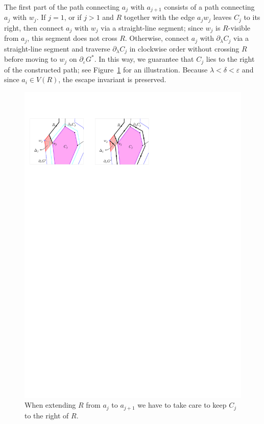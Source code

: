\documentclass[11pt]{patmorin}
\begin{document}
The first part of the path connecting $a_j$ with $a_{j+1}$ consists of a path connecting $a_j$ with $w_j$. If $j=1$, or if $j>1$ and $R$ together with the edge $a_j w_j$ leaves $C_j$ to its right, then connect $a_j$ with $w_j$ via a straight-line segment; since $w_j$ is $R$-visible from $a_j$, this segment does not cross $R$. Otherwise, connect $a_j$ with $\partial_\lambda C_j$ via a straight-line segment and traverse $\partial_\lambda C_j$ in clockwise order without crossing $R$ before moving to $w_j$ on $\partial_\varepsilon G^*$. In this way, we guarantee that $C_j$ lies to the right of the constructed path; see Figure~\ref{fig: Component to the right} for an illustration. Because $\lambda < \delta < \varepsilon$ and since $a_i\in V(R)$, the escape invariant is preserved.

\begin{figure}[tb]
\centering
\includegraphics[width=1\textwidth]{img/ComponentToTheRight.pdf}
\caption{When extending $R$ from $a_j$ to $a_{j+1}$ we have to take care to
    keep $C_j$ to the right of $R$.}
\label{fig: Component to the right}
\end{figure}
\end{document}
